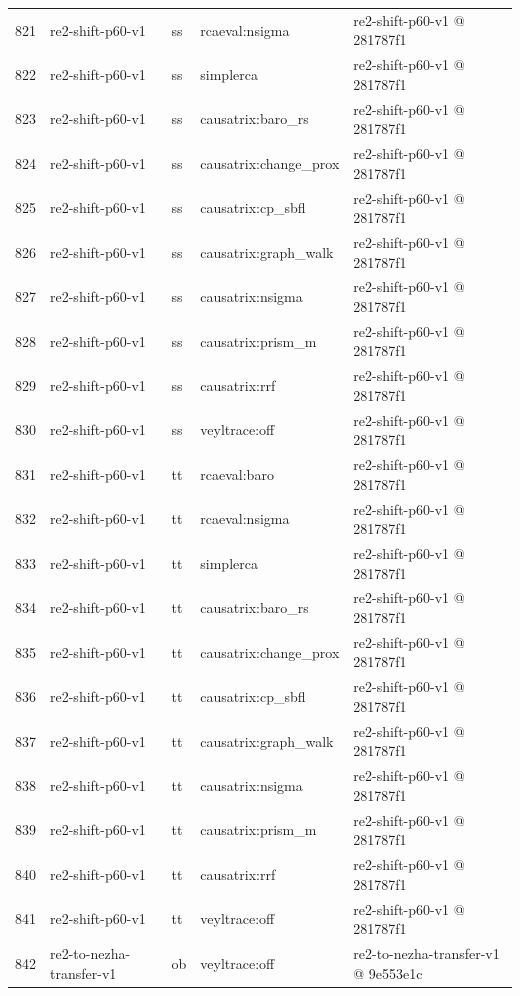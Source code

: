 \begin{longtable}{@{}r>{\raggedright\arraybackslash}p{87.0pt}>{\raggedright\arraybackslash}p{18.0pt}>{\raggedright\arraybackslash}p{63.0pt}>{\raggedright\arraybackslash}p{108.0pt}@{}}
821 & re2-shift-p60-v1 & ss & rcaeval:nsigma & re2-shift-p60-v1 @ 281787f1 \\
822 & re2-shift-p60-v1 & ss & simplerca & re2-shift-p60-v1 @ 281787f1 \\
823 & re2-shift-p60-v1 & ss & causatrix:baro\_rs & re2-shift-p60-v1 @ 281787f1 \\
824 & re2-shift-p60-v1 & ss & causatrix:change\_prox & re2-shift-p60-v1 @ 281787f1 \\
825 & re2-shift-p60-v1 & ss & causatrix:cp\_sbfl & re2-shift-p60-v1 @ 281787f1 \\
826 & re2-shift-p60-v1 & ss & causatrix:graph\_walk & re2-shift-p60-v1 @ 281787f1 \\
827 & re2-shift-p60-v1 & ss & causatrix:nsigma & re2-shift-p60-v1 @ 281787f1 \\
828 & re2-shift-p60-v1 & ss & causatrix:prism\_m & re2-shift-p60-v1 @ 281787f1 \\
829 & re2-shift-p60-v1 & ss & causatrix:rrf & re2-shift-p60-v1 @ 281787f1 \\
830 & re2-shift-p60-v1 & ss & veyltrace:off & re2-shift-p60-v1 @ 281787f1 \\
831 & re2-shift-p60-v1 & tt & rcaeval:baro & re2-shift-p60-v1 @ 281787f1 \\
832 & re2-shift-p60-v1 & tt & rcaeval:nsigma & re2-shift-p60-v1 @ 281787f1 \\
833 & re2-shift-p60-v1 & tt & simplerca & re2-shift-p60-v1 @ 281787f1 \\
834 & re2-shift-p60-v1 & tt & causatrix:baro\_rs & re2-shift-p60-v1 @ 281787f1 \\
835 & re2-shift-p60-v1 & tt & causatrix:change\_prox & re2-shift-p60-v1 @ 281787f1 \\
836 & re2-shift-p60-v1 & tt & causatrix:cp\_sbfl & re2-shift-p60-v1 @ 281787f1 \\
837 & re2-shift-p60-v1 & tt & causatrix:graph\_walk & re2-shift-p60-v1 @ 281787f1 \\
838 & re2-shift-p60-v1 & tt & causatrix:nsigma & re2-shift-p60-v1 @ 281787f1 \\
839 & re2-shift-p60-v1 & tt & causatrix:prism\_m & re2-shift-p60-v1 @ 281787f1 \\
840 & re2-shift-p60-v1 & tt & causatrix:rrf & re2-shift-p60-v1 @ 281787f1 \\
841 & re2-shift-p60-v1 & tt & veyltrace:off & re2-shift-p60-v1 @ 281787f1 \\
842 & re2-to-nezha-transfer-v1 & ob & veyltrace:off & re2-to-nezha-transfer-v1 @ 9e553e1c \\

\end{longtable}
